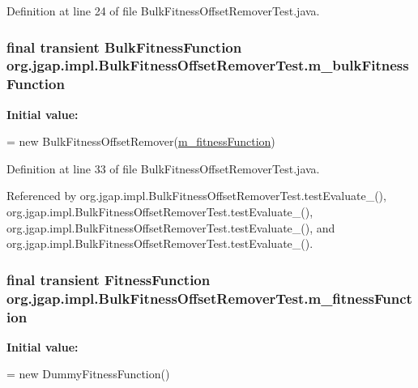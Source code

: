 Definition at line 24 of file Bulk\-Fitness\-Offset\-Remover\-Test.\-java.

\hypertarget{classorg_1_1jgap_1_1impl_1_1_bulk_fitness_offset_remover_test_abee16fba385081beafcf80b3bd269be0}{
\subsubsection[{m\-\_\-bulk\-Fitness\-Function}]{\setlength{\rightskip}{0pt plus 5cm}final transient {\bf Bulk\-Fitness\-Function} org.\-jgap.\-impl.\-Bulk\-Fitness\-Offset\-Remover\-Test.\-m\-\_\-bulk\-Fitness\-Function\hspace{0.3cm}{\ttfamily [private]}}}\label{classorg_1_1jgap_1_1impl_1_1_bulk_fitness_offset_remover_test_abee16fba385081beafcf80b3bd269be0}
{\bfseries Initial value\-:}
\begin{DoxyCode}
=
      \textcolor{keyword}{new} BulkFitnessOffsetRemover(\hyperlink{classorg_1_1jgap_1_1impl_1_1_bulk_fitness_offset_remover_test_a95ce67f68c7c6892c52d27ee6a74cae0}{m\_fitnessFunction})
\end{DoxyCode}


Definition at line 33 of file Bulk\-Fitness\-Offset\-Remover\-Test.\-java.



Referenced by org.\-jgap.\-impl.\-Bulk\-Fitness\-Offset\-Remover\-Test.\-test\-Evaluate\-\_(), org.\-jgap.\-impl.\-Bulk\-Fitness\-Offset\-Remover\-Test.\-test\-Evaluate\-\_(), org.\-jgap.\-impl.\-Bulk\-Fitness\-Offset\-Remover\-Test.\-test\-Evaluate\-\_(), and org.\-jgap.\-impl.\-Bulk\-Fitness\-Offset\-Remover\-Test.\-test\-Evaluate\-\_().

\hypertarget{classorg_1_1jgap_1_1impl_1_1_bulk_fitness_offset_remover_test_a95ce67f68c7c6892c52d27ee6a74cae0}{
\subsubsection[{m\-\_\-fitness\-Function}]{\setlength{\rightskip}{0pt plus 5cm}final transient {\bf Fitness\-Function} org.\-jgap.\-impl.\-Bulk\-Fitness\-Offset\-Remover\-Test.\-m\-\_\-fitness\-Function\hspace{0.3cm}{\ttfamily [private]}}}\label{classorg_1_1jgap_1_1impl_1_1_bulk_fitness_offset_remover_test_a95ce67f68c7c6892c52d27ee6a74cae0}
{\bfseries Initial value\-:}
\begin{DoxyCode}
=
      \textcolor{keyword}{new} DummyFitnessFunction()
\end{DoxyCode}


